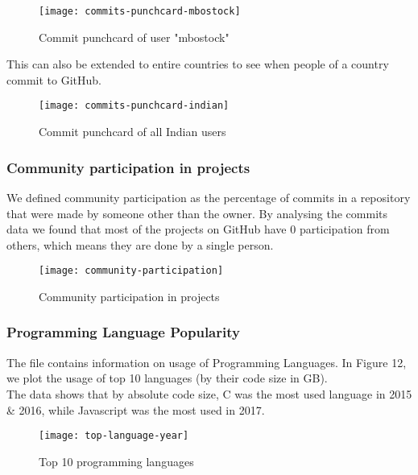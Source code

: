 \begin{figure}[htb]
\centering
\texttt{[image: commits-punchcard-mbostock]}
\caption{Commit punchcard of user "mbostock"}
\end{figure}

This can also be extended to entire countries to see when people of a country commit to GitHub.

\begin{figure}[htb]
\centering
\texttt{[image: commits-punchcard-indian]}
\caption{Commit punchcard of all Indian users}
\end{figure}

\newpage
\subsubsection{Community participation in projects}

We defined community participation as the percentage of commits in a repository that were made
by someone other than the owner. By analysing the commits data we found that most of the projects
on GitHub have 0 participation from others, which means they are done by a single person.

\begin{figure}[htb]
\centering
\centerline{\texttt{[image: community-participation]}}
\caption{Community participation in projects}
\end{figure}

\subsubsection{Programming Language Popularity}

The  file contains information on usage of Programming Languages.
In Figure 12, we plot the usage of top 10 languages (by their code size in GB). \\

The data shows that by absolute code size, C was the most used language in 2015 \& 2016, while
Javascript was the most used in 2017.

\begin{figure}[htb]
\centering
\texttt{[image: top-language-year]}
\caption{Top 10 programming languages}
\end{figure}
